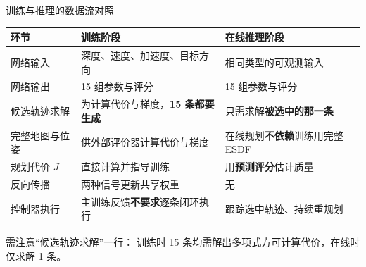 \begin{frame}{训练与推理的数据流对照}
  \scriptsize
  \begin{center}
  \begin{tabular}{@{}p{}p{}p{}@{}}
    \toprule
    \textbf{环节} & \textbf{训练阶段} & \textbf{在线推理阶段} \\
    \midrule
    网络输入 & 深度、速度、加速度、目标方向 & 相同类型的可观测输入 \\
    \addlinespace
    网络输出 & 15 组参数与评分 & 15 组参数与评分 \\
    \addlinespace
    候选轨迹求解 & 为计算代价与梯度，\textbf{15 条都要生成} & 只需求解\textbf{被选中的那一条} \\
    \addlinespace
    完整地图与位姿 & 供外部评价器计算代价与梯度 & 在线规划\textbf{不依赖}训练用完整 ESDF \\
    \addlinespace
    规划代价 $J$ & 直接计算并指导训练 & 用\textbf{预测评分}估计质量 \\
    \addlinespace
    反向传播 & 两种信号更新共享权重 & 无 \\
    \addlinespace
    控制器执行 & 主训练反馈\textbf{不要求}逐条闭环执行 & 跟踪选中轨迹、持续重规划 \\
    \bottomrule
  \end{tabular}
  \end{center}
  \vspace{0.2em}
  \begin{reading}
    \scriptsize
    需注意“候选轨迹求解”一行：
    训练时 15 条均需解出多项式方可计算代价，在线时仅求解 1 条。
  \end{reading}
\end{frame}
